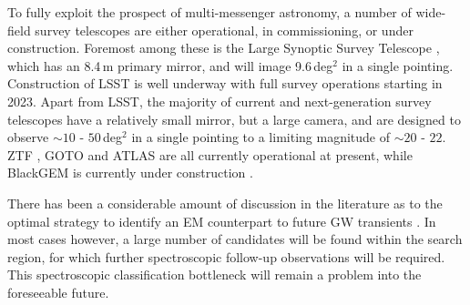 \documentclass{aa}
\begin{document}

To fully exploit the prospect of multi-messenger astronomy, a number of wide-field survey telescopes are either operational, in commissioning, or under construction. Foremost among these is the Large Synoptic Survey Telescope \citep[LSST;][]{LSSTbook}, which has an 8.4\,m primary mirror, and will image 9.6\,deg$^2$ in a single pointing. Construction of LSST is well underway
with full survey operations starting in 2023.
Apart from LSST, the majority of current and next-generation survey telescopes have a relatively small mirror, but a large camera, and are designed to observe $\sim10$ - $50\,$deg$^2$ in a single pointing to a limiting magnitude of $\sim20$ - $22$. ZTF \citep{ZTF}, GOTO \citep{GOTO} and ATLAS \citep{ATLAS} are all currently operational at present, while BlackGEM is currently under construction \citep{BlackGEM}.

There has been a considerable amount of discussion in the literature as to the optimal strategy to identify an EM counterpart to future GW transients \citep{2016ApJ...820..136G, 2011MNRAS.415L..26C, 2016A&A...592A..82G, 2017ApJ...834...84C, 2014MNRAS.437..649S, 2016MNRAS.462.1085A}. In most cases however, a large number of candidates will be found within the search region, for which further spectroscopic follow-up observations will be required. This spectroscopic classification bottleneck will remain a problem into the foreseeable future.

\end{document}
